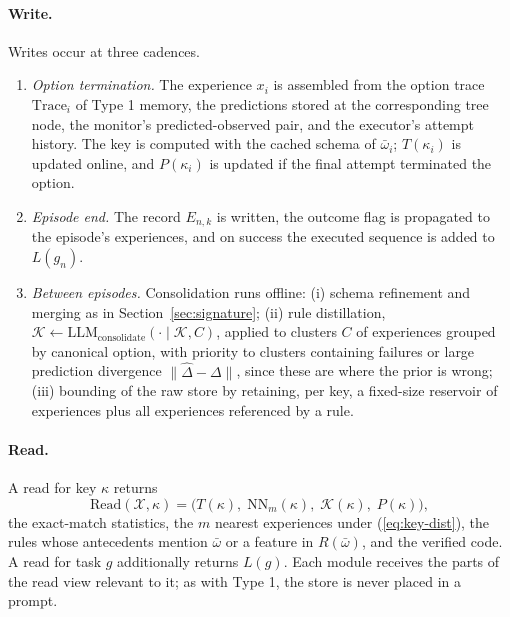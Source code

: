 \documentclass[11pt]{article}
\newcommand{\llm}[1]{\mathrm{LLM}_{\mathrm{#1}}}
\newcommand{\Rel}{R}
\newcommand{\Read}{\mathrm{Read}}
\newcommand{\Trace}{\mathrm{Trace}}
\begin{document}
\paragraph{Write.}
Writes occur at three cadences.
\begin{enumerate}[leftmargin=1.5em,itemsep=1pt]
\item \emph{Option termination.} The experience $x_i$ is assembled from the option trace $\Trace_i$ of Type 1 memory, the predictions stored at the corresponding tree node, the monitor's predicted-observed pair, and the executor's attempt history. The key is computed with the cached schema of $\bar\omega_i$; $T(\kappa_i)$ is updated online, and $P(\kappa_i)$ is updated if the final attempt terminated the option.
\item \emph{Episode end.} The record $E_{n,k}$ is written, the outcome flag is propagated to the episode's experiences, and on success the executed sequence is added to $L(g_n)$.
\item \emph{Between episodes.} Consolidation runs offline: (i) schema refinement and merging as in Section~\ref{sec:signature}; (ii) rule distillation, $\mathcal{K}\leftarrow\llm{consolidate}(\cdot\mid\mathcal{K},C)$, applied to clusters $C$ of experiences grouped by canonical option, with priority to clusters containing failures or large prediction divergence $\|\hat\Delta-\Delta\|$, since these are where the prior is wrong; (iii) bounding of the raw store by retaining, per key, a fixed-size reservoir of experiences plus all experiences referenced by a rule.
\end{enumerate}

\paragraph{Read.}
A read for key $\kappa$ returns
\begin{equation}
\Read(\mathcal{X},\kappa)=\big(T(\kappa),\;\mathrm{NN}_m(\kappa),\;\mathcal{K}(\kappa),\;P(\kappa)\big),
\label{eq:type2-read}
\end{equation}
the exact-match statistics, the $m$ nearest experiences under (\ref{eq:key-dist}), the rules whose antecedents mention $\bar\omega$ or a feature in $\Rel(\bar\omega)$, and the verified code. A read for task $g$ additionally returns $L(g)$. Each module receives the parts of the read view relevant to it; as with Type 1, the store is never placed in a prompt.
\end{document}
